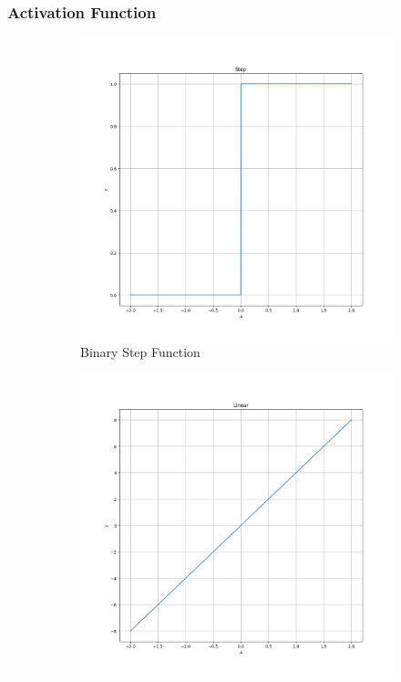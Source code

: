 \newpage

\subsubsection{Activation Function}
\begin{figure}
	\centering
	\begin{subfigure}{0.24\linewidth}
		\includegraphics[width=\linewidth]{figures/step.png}
		\caption{Binary Step Function}
	\end{subfigure}
	\begin{subfigure}{0.24\linewidth}
		\includegraphics[width=\linewidth]{figures/linear.png}

\end{subfigure}
\end{figure}
